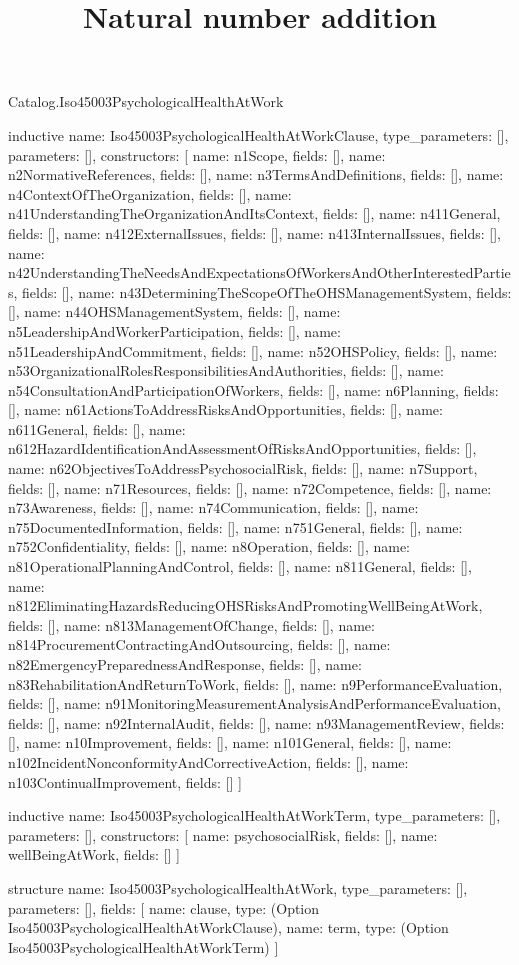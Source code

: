 \begin{lexlean}{Catalog.Iso45003PsychologicalHealthAtWork}
\title{Natural number addition}
\begin{semanticmodule}
inductive{
  name: Iso45003PsychologicalHealthAtWorkClause,
  type_parameters: [],
  parameters: [],
  constructors: [
    {name: n1Scope, fields: []},
    {name: n2NormativeReferences, fields: []},
    {name: n3TermsAndDefinitions, fields: []},
    {name: n4ContextOfTheOrganization, fields: []},
    {name: n41UnderstandingTheOrganizationAndItsContext, fields: []},
    {name: n411General, fields: []},
    {name: n412ExternalIssues, fields: []},
    {name: n413InternalIssues, fields: []},
    {name: n42UnderstandingTheNeedsAndExpectationsOfWorkersAndOtherInterestedParties, fields: []},
    {name: n43DeterminingTheScopeOfTheOHSManagementSystem, fields: []},
    {name: n44OHSManagementSystem, fields: []},
    {name: n5LeadershipAndWorkerParticipation, fields: []},
    {name: n51LeadershipAndCommitment, fields: []},
    {name: n52OHSPolicy, fields: []},
    {name: n53OrganizationalRolesResponsibilitiesAndAuthorities, fields: []},
    {name: n54ConsultationAndParticipationOfWorkers, fields: []},
    {name: n6Planning, fields: []},
    {name: n61ActionsToAddressRisksAndOpportunities, fields: []},
    {name: n611General, fields: []},
    {name: n612HazardIdentificationAndAssessmentOfRisksAndOpportunities, fields: []},
    {name: n62ObjectivesToAddressPsychosocialRisk, fields: []},
    {name: n7Support, fields: []},
    {name: n71Resources, fields: []},
    {name: n72Competence, fields: []},
    {name: n73Awareness, fields: []},
    {name: n74Communication, fields: []},
    {name: n75DocumentedInformation, fields: []},
    {name: n751General, fields: []},
    {name: n752Confidentiality, fields: []},
    {name: n8Operation, fields: []},
    {name: n81OperationalPlanningAndControl, fields: []},
    {name: n811General, fields: []},
    {name: n812EliminatingHazardsReducingOHSRisksAndPromotingWellBeingAtWork, fields: []},
    {name: n813ManagementOfChange, fields: []},
    {name: n814ProcurementContractingAndOutsourcing, fields: []},
    {name: n82EmergencyPreparednessAndResponse, fields: []},
    {name: n83RehabilitationAndReturnToWork, fields: []},
    {name: n9PerformanceEvaluation, fields: []},
    {name: n91MonitoringMeasurementAnalysisAndPerformanceEvaluation, fields: []},
    {name: n92InternalAudit, fields: []},
    {name: n93ManagementReview, fields: []},
    {name: n10Improvement, fields: []},
    {name: n101General, fields: []},
    {name: n102IncidentNonconformityAndCorrectiveAction, fields: []},
    {name: n103ContinualImprovement, fields: []}
  ]
}

inductive{
  name: Iso45003PsychologicalHealthAtWorkTerm,
  type_parameters: [],
  parameters: [],
  constructors: [
    {name: psychosocialRisk, fields: []},
    {name: wellBeingAtWork, fields: []}
  ]
}

structure{
  name: Iso45003PsychologicalHealthAtWork,
  type_parameters: [],
  parameters: [],
  fields: [
    {name: clause, type: (Option Iso45003PsychologicalHealthAtWorkClause)},
    {name: term, type: (Option Iso45003PsychologicalHealthAtWorkTerm)}
  ]
}
\end{semanticmodule}
\end{lexlean}
